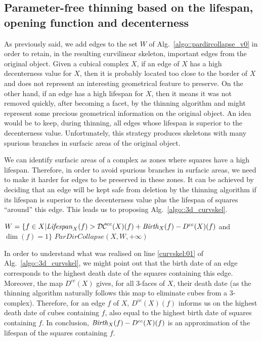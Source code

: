\documentclass[final,envcountsame]{llncs}
\def\mydist1{D}
\def\mydecent{\mathcal{DC}}
\def\cplDist1#1{\mydist1^{cc}(#1)}
\def\cpldecent#1{\mydecent^{cc}(#1)}
\def\quotes#1{``#1''}
\def\birth#1#2{\mbox{\it{}Birth\/}_{#2}(#1)}
\def\lifespan#1#2{\mbox{\it{}Lifespan\/}_{#2}(#1)}
\def\allfaces#1{\mathbb{F}^{#1}}
\def\subcomplex#1#2{#1 \preceq #2}
\def\complex#1#2{\subcomplex{#2}{\allfaces{#1}}}
\def\mydim#1{\dim(#1)}
\begin{document}
\subsection{Parameter-free thinning based on the lifespan, opening function and decenterness}
As previously said, we add edges to the set $W$ of Alg.~\ref{algo::pardircollapse_v0} in order to retain, in the resulting curvilinear skeleton, important edges from the original object. Given a cubical complex $X$, if an edge of $X$ has a high decenterness value for $X$, then it is probably located too close to the border of $X$ and does not represent an interesting geometrical feature to preserve.
On the other hand, if an edge has a high lifespan for $X$, then it means it was not removed quickly, after becoming a facet, by the thinning algorithm and might represent some precious geometrical information on the original object. An idea would be to keep, during thinning, all edges whose lifespan is superior to the decenterness value. Unfortunately, this strategy produces skeletons with many spurious branches in surfacic areas of the original object.

We can identify surfacic areas of a complex as zones where squares have a high lifespan. Therefore, in order to avoid spurious branches in surfacic areas, we need to make it harder for edges to be preserved in these zones. It can be achieved by deciding that an edge will be kept safe from deletion by the thinning algorithm if its lifespan is superior to the decenterness value plus the lifespan of squares \quotes{around} this edge. This leads us to proposing Alg.~\ref{algo::3d_curvskel}. 

\begin{algorithm}[ht]
\label{algo::3d_curvskel}
\caption[CurvilinearSkeleton]{$CurvilinearSkeleton(X)$}
\KwData{A cubical complex $\complex{3}{X}$}
\KwResult{A cubical complex $\complex{3}{Y}$}
 $W=\{f \in X | \lifespan{f}{X} > \cpldecent{X}(f) + \birth{f}{X} - \cplDist1{X}(f)$ and $\mydim{f}=1\}$\;
\Return $ParDirCollapse(X,W,+\infty)$\;
\end{algorithm}

In order to understand what was realised on line \ref{curvskel:01} of Alg.~\ref{algo::3d_curvskel}, we might point out that the birth date of an edge corresponds to the highest death date of the squares containing this edge. Moreover, the map $\cplDist1{X}$ gives, for all 3-faces of $X$, their death date (as the thinning algorithm naturally follows this map to eliminate cubes from a 3-complex). Therefore, for an edge $f$ of $X$, $\cplDist1{X}(f)$ informs us on the highest death date of cubes containing $f$, also equal to the highest birth date of squares containing $f$. In conclusion, $\birth{f}{X} - \cplDist1{X}(f)$ is an approximation of the lifespan of the squares containing $f$.
\end{document}
